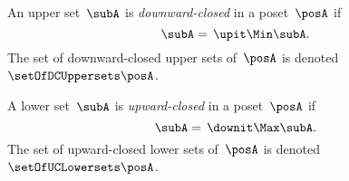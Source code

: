 \begin{definition}
    \label{def:downward-closed-upperset}
    An upper set~$\subA$ is \emph{downward-closed} in a poset~$\posA$ if
    \begin{equation}
        \subA =\, \upit  \Min \subA.
    \end{equation}
    The set of downward-closed upper sets of~$\posA$ is denoted~$\setOfDCUppersets \posA$.

\end{definition}

\begin{definition}
    \label{def:upward-closed-lowerset}
    A lower set~$\subA$ is \emph{upward-closed} in a poset~$\posA$ if
    \begin{equation}
        \subA =\, \downit  \Max \subA.
    \end{equation}
    The set of upward-closed lower sets of~$\posA$ is denoted~$\setOfUCLowersets \posA$.
\end{definition}
